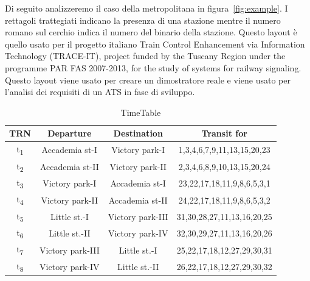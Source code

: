\documentclass{ewic}
\begin{document}
Di seguito analizzeremo il caso della metropolitana in figura~\ref{fig:example}.
I rettagoli trattegiati indicano la presenza di una stazione mentre il numero romano sul cerchio indica il numero del binario della stazione.
Questo layout è quello usato per il progetto italiano Train Control Enhancement via Information Technology (TRACE-IT), project funded by the Tuscany Region under the programme PAR FAS 2007-2013, for the study of systems for railway signaling.
Questo layout viene usato per creare un dimostratore reale e viene usato per l'analisi dei requisiti di un ATS in fase di sviluppo. 
\begin{table}[htbp]
\newcommand\T{\rule{0pt}{3ex}}
\newcommand\B{\rule[-1.2ex]{0pt}{0pt}}
\begin{centering}
\begin{scriptsize}
\begin{tabular}{|c|c|c|c|}
\hline
\hline

 \T \textbf{TRN}  & \textbf{Departure}  & \textbf{Destination} & \textbf{Transit for} \\

\hline 
\hline


\T {\normalsize t\textsubscript{1}} & Accademia st-I& Victory park-I& {\scriptsize 1,3,4,6,7,9,11,13,15,20,23} \\
\hline

\T {\normalsize t\textsubscript{2}}  & Accademia st-II& Victory park-II& 2,3,4,6,8,9,10,13,15,20,24 \\
\hline

\T {\normalsize t\textsubscript{3}}  &Victory park-I&Accademia st-I& 23,22,17,18,11,9,8,6,5,3,1 \\
\hline
 
\T {\normalsize t\textsubscript{4}}  & Victory park-II&Accademia st-II& 24,22,17,18,11,9,8,6,5,3,2 \\
\hline
\T {\normalsize t\textsubscript{5}}  &Little st.-I&Victory park-III& 31,30,28,27,11,13,16,20,25 \\
\hline
\T {\normalsize t\textsubscript{6}}  & Little st.-II&Victory park-IV& 32,30,29,27,11,13,16,20,26 \\
\hline
\T {\normalsize t\textsubscript{7}}  & Victory park-III&Little st.-I&  25,22,17,18,12,27,29,30,31\\
\hline
\T {\normalsize t\textsubscript{8}}  & Victory park-IV& Little st.-II & 26,22,17,18,12,27,29,30,32\\
\hline \hline
\end{tabular}
\end{scriptsize}
\\[4pt]
\end{centering}
\caption{TimeTable}
\label{tab:timetalbe}
\end{table}
\end{document}
